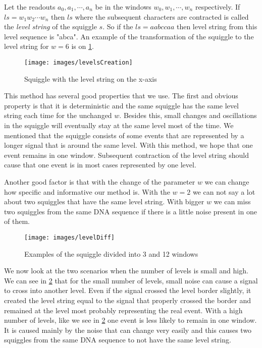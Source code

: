 Let the readouts $a_0, a_1, \cdots, a_n$ be in the windows $w_0, w_1, \cdots ,w_n$
respectively. If $ls=w_1w_2\cdots w_n$ then $ls$ where the subsequent characters are contracted
is called the \textit{level string} of the squiggle $s$. So if the $ls=aabccaa$
then level string from this level sequence is "abca". An example of the transformation
of the squiggle to the level string for $w=6$ is on \ref{obr:levelsCreation}.

\begin{figure}
\centerline{\texttt{[image: images/levelsCreation]}}
\caption[TODO]{Squiggle with the level string on the x-axis}
\label{obr:levelsCreation}
\end{figure}

This method has several good properties that we use. The first and obvious
property is that it is deterministic and the same squiggle has the same level
string each time for the unchanged $w$. Besides this, small changes and oscillations in the squiggle will
eventually stay at the same level most of the time. We mentioned that the squiggle
consists of some events that are represented by a longer signal that is around the same level.
With this method, we hope that one event remains in one window. Subsequent
contraction of the level string should cause that one event is in most cases represented by
one level.

Another good factor is that with the change of the parameter $w$ we can change how specific
and informative our method is. With the $w=2$ we can not say a lot about two squiggles
that have the same level string. With bigger $w$ we can miss two squiggles from
the same DNA sequence if there is a little noise present in one of them.

\begin{figure}
\centerline{\texttt{[image: images/levelDiff]}}
\caption[TODO]{Examples of the squiggle divided into 3 and 12 windows}
\label{obr:levelDiff}
\end{figure}

We now look at the two scenarios when the number of levels is small and high.
We can see in \ref{obr:levelDiff} that for the small number of levels, small noise can cause a signal to cross into another level. 
Even if the signal crossed the level border slightly, it created the level
string equal to the signal that properly crossed the border and remained at the level
most probably representing the real event. With a high number of levels, like we see in \ref{obr:levelDiff} one event is less likely to remain in one window. It is caused mainly by the noise that can change very easily and this causes
two squiggles from the same DNA sequence to not have the same level string.

